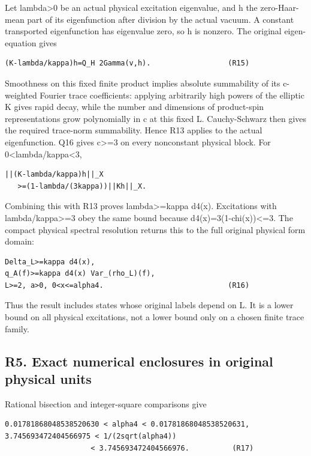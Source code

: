 \documentclass[11pt,a4paper]{article}
\renewcommand{\[}{\begingroup\small\originaldisplaystart}
\renewcommand{\]}{\originaldisplayend\endgroup}
\begin{document}
Let lambda\textgreater0 be an actual physical excitation eigenvalue, and
h the zero-Haar-mean part of its eigenfunction after division by the
actual vacuum. A constant transported eigenfunction has eigenvalue zero,
so h is nonzero. The original eigen-equation gives

\begin{verbatim}
(K-lambda/kappa)h=Q_H 2Gamma(v,h).                  (R15)
\end{verbatim}

Smoothness on this fixed finite product implies absolute summability of
its c-weighted Fourier trace coefficients: applying arbitrarily high
powers of the elliptic K gives rapid decay, while the number and
dimensions of product-spin representations grow polynomially in c at
this fixed L. Cauchy-Schwarz then gives the required trace-norm
summability. Hence R13 applies to the actual eigenfunction. Q16 gives
c\textgreater=3 on every nonconstant physical block. For
0\textless lambda/kappa\textless3,

\begin{verbatim}
||(K-lambda/kappa)h||_X
   >=(1-lambda/(3kappa))||Kh||_X.
\end{verbatim}

Combining this with R13 proves lambda\textgreater=kappa d4(x).
Excitations with lambda/kappa\textgreater=3 obey the same bound because
d4(x)=3(1-chi(x))\textless=3. The compact physical spectral resolution
returns this to the full original physical form domain:

\begin{verbatim}
Delta_L>=kappa d4(x),
q_A(f)>=kappa d4(x) Var_(rho_L)(f),
L>=2, a>0, 0<x<=alpha4.                             (R16)
\end{verbatim}

Thus the result includes states whose original labels depend on L. It is
a lower bound on all physical excitations, not a lower bound only on a
chosen finite trace family.

\subsection{R5. Exact numerical enclosures in original physical
units}\label{r5.-exact-numerical-enclosures-in-original-physical-units}

Rational bisection and integer-square comparisons give

\begin{verbatim}
0.01781868048538520630 < alpha4 < 0.01781868048538520631,
3.745693472404566975 < 1/(2sqrt(alpha4))
                    < 3.745693472404566976.          (R17)
\end{verbatim}
\end{document}
